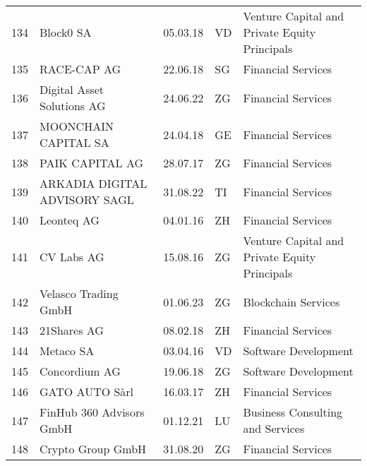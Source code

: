 \begin{tabular}{lllll}
134 &                                          Block0 SA &      05.03.18 &     VD &  Venture Capital and Private Equity Principals \\
135 &                                        RACE-CAP AG &      22.06.18 &     SG &                             Financial Services \\
136 &                         Digital Asset Solutions AG &      24.06.22 &     ZG &                             Financial Services \\
137 &                               MOONCHAIN CAPITAL SA &      24.04.18 &     GE &                             Financial Services \\
138 &                                    PAIK CAPITAL AG &      28.07.17 &     ZG &                             Financial Services \\
139 &                      ARKADIA DIGITAL ADVISORY SAGL &      31.08.22 &     TI &                             Financial Services \\
140 &                                         Leonteq AG &      04.01.16 &     ZH &                             Financial Services \\
141 &                                         CV Labs AG &      15.08.16 &     ZG &  Venture Capital and Private Equity Principals \\
142 &                               Velasco Trading GmbH &      01.06.23 &     ZG &                            Blockchain Services \\
143 &                                        21Shares AG &      08.02.18 &     ZH &                             Financial Services \\
144 &                                          Metaco SA &      03.04.16 &     VD &                           Software Development \\
145 &                                      Concordium AG &      19.06.18 &     ZG &                           Software Development \\
146 &                                     GATO AUTO Sàrl &      16.03.17 &     ZH &                             Financial Services \\
147 &                           FinHub 360 Advisors GmbH &      01.12.21 &     LU &               Business Consulting and Services \\
148 &                                  Crypto Group GmbH &      31.08.20 &     ZG &                             Financial Services \\

\end{tabular}
